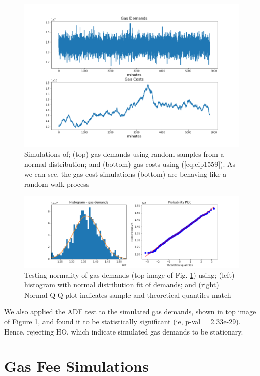 \documentclass{article}
\begin{document}
\begin{figure}
\centering
\includegraphics[width=5in]{gas.png}
\caption{Simulations of; (top) gas demands using random samples from a normal distribution; and (bottom) gas costs using (\ref{eq:eip1559}). As we can see, the gas cost simulations (bottom) are behaving like a random walk process} 
\label{fig:gas}
\end{figure} 

\begin{figure}
\centering
\includegraphics[width=5in]{gaussian_analysis.png}
\caption{Testing normality of gas demands (top image of Fig. \ref{fig:gas}) using; (left) histogram with normal distribution fit of demands; and (right) Normal Q-Q plot indicates sample and theoretical quantiles match} 
\label{fig:eda}
\end{figure} 

We also applied the ADF test to the simulated gas demands, shown in top image of Figure \ref{fig:gas}, and found it to be statistically significant (ie, p-val = 2.33e-29). Hence, rejecting HO, which indicate simulated gas demands to be stationary. 


\section{Gas Fee Simulations}
\label{section:gas_fees}
\end{document}
